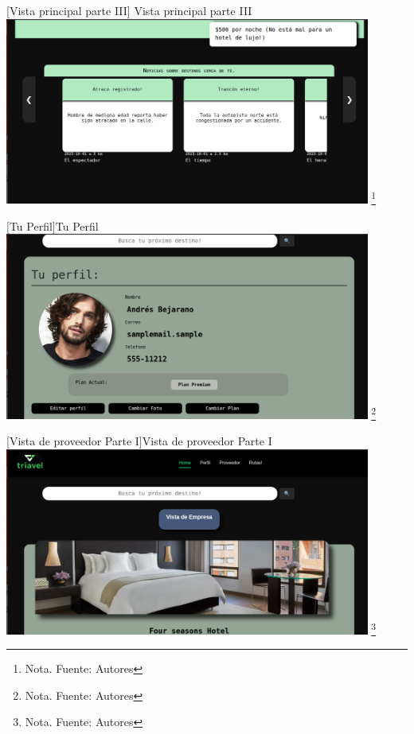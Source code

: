 \begin{itemize}
    \vspace{2mm}
    \begin{minipage}{0.9\textwidth}
    \centering
    [{Vista principal parte III}]{ Vista principal parte III}
    \label{prot3}
    \includegraphics[width=0.9\textwidth]{Content/Images/VistaGeneral3.png}
    \footnote{Nota. \textup{Fuente: Autores}}
    \end{minipage}

    \vspace{2mm}
    \begin{minipage}{0.9\textwidth}
    \centering
    [{Tu Perfil}]{Tu Perfil}
    \label{prot4}
    \includegraphics[width=0.9\textwidth]{Content/Images/TuPerfil.png}
    \footnote{Nota. \textup{Fuente: Autores}}
    \end{minipage}

     \vspace{2mm}
    \begin{minipage}{0.9\textwidth}
    \centering
    [{Vista de proveedor Parte I}]{Vista de proveedor Parte I}
    \label{prot5}
    \includegraphics[width=0.9\textwidth]{Content/Images/VistaProveedor1.png}
    \footnote{Nota. \textup{Fuente: Autores}}
    \end{minipage}


\end{itemize}
